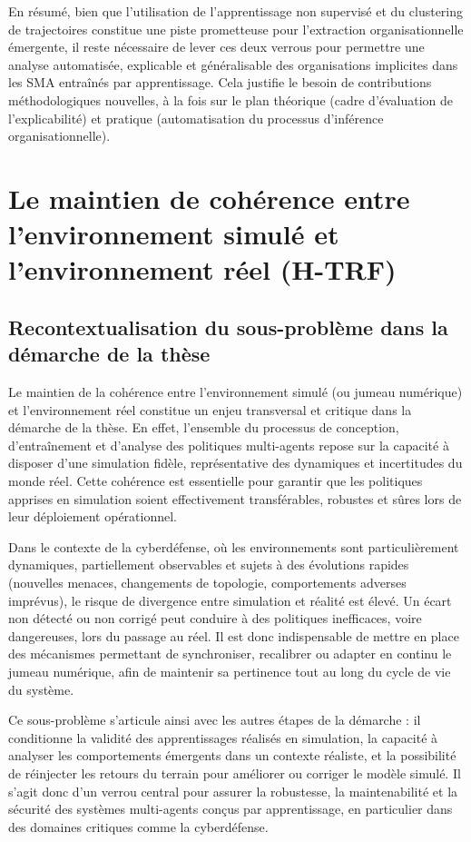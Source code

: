 En résumé, bien que l’utilisation de l’apprentissage non supervisé et du clustering de trajectoires constitue une piste prometteuse pour l’extraction organisationnelle émergente, il reste nécessaire de lever ces deux verrous pour permettre une analyse automatisée, explicable et généralisable des organisations implicites dans les SMA entraînés par apprentissage. Cela justifie le besoin de contributions méthodologiques nouvelles, à la fois sur le plan théorique (cadre d’évaluation de l’explicabilité) et pratique (automatisation du processus d’inférence organisationnelle).



\section{Le maintien de cohérence entre l'environnement simulé et l'environnement réel (H-TRF)}

\subsection*{Recontextualisation du sous-problème dans la démarche de la thèse}

Le maintien de la cohérence entre l'environnement simulé (ou jumeau numérique) et l'environnement réel constitue un enjeu transversal et critique dans la démarche de la thèse. En effet, l'ensemble du processus de conception, d'entraînement et d'analyse des politiques multi-agents repose sur la capacité à disposer d'une simulation fidèle, représentative des dynamiques et incertitudes du monde réel. Cette cohérence est essentielle pour garantir que les politiques apprises en simulation soient effectivement transférables, robustes et sûres lors de leur déploiement opérationnel.

Dans le contexte de la cyberdéfense, où les environnements sont particulièrement dynamiques, partiellement observables et sujets à des évolutions rapides (nouvelles menaces, changements de topologie, comportements adverses imprévus), le risque de divergence entre simulation et réalité est élevé. Un écart non détecté ou non corrigé peut conduire à des politiques inefficaces, voire dangereuses, lors du passage au réel. Il est donc indispensable de mettre en place des mécanismes permettant de synchroniser, recalibrer ou adapter en continu le jumeau numérique, afin de maintenir sa pertinence tout au long du cycle de vie du système.

Ce sous-problème s'articule ainsi avec les autres étapes de la démarche : il conditionne la validité des apprentissages réalisés en simulation, la capacité à analyser les comportements émergents dans un contexte réaliste, et la possibilité de réinjecter les retours du terrain pour améliorer ou corriger le modèle simulé. Il s'agit donc d'un verrou central pour assurer la robustesse, la maintenabilité et la sécurité des systèmes multi-agents conçus par apprentissage, en particulier dans des domaines critiques comme la cyberdéfense.

